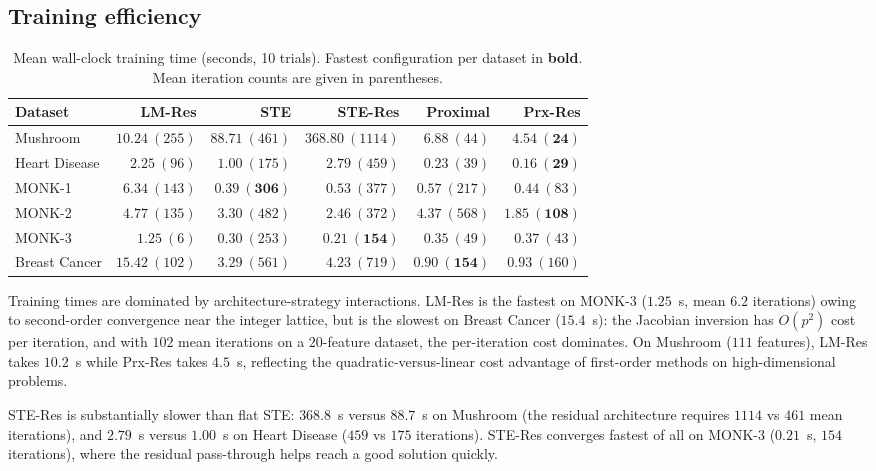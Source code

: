 \documentclass[lettersize,journal]{IEEEtran}
\begin{document}
\subsection{Training efficiency}
\label{ssec:time}

\begin{table}[t]
\centering
\caption{Mean wall-clock training time (seconds, 10 trials).
Fastest configuration per dataset in \textbf{bold}.
Mean iteration counts are given in parentheses.}
\label{tab:time}
\setlength{\tabcolsep}{6pt}
\begin{tabular}{l rrrrr}
\toprule
Dataset & LM-Res & STE & STE-Res & Proximal & Prx-Res \\
\midrule
Mushroom
  & $10.24\ (255)$ & $88.71\ (461)$ & $368.80\ (1114)$
  & $6.88\ (44)$   & $\mathbf{4.54\ (24)}$ \\
Heart Disease
  & $2.25\ (96)$  & $1.00\ (175)$  & $2.79\ (459)$
  & $0.23\ (39)$  & $\mathbf{0.16\ (29)}$ \\
MONK-1
  & $6.34\ (143)$ & $\mathbf{0.39\ (306)}$ & $0.53\ (377)$
  & $0.57\ (217)$ & $0.44\ (83)$ \\
MONK-2
  & $4.77\ (135)$ & $3.30\ (482)$ & $2.46\ (372)$
  & $4.37\ (568)$ & $\mathbf{1.85\ (108)}$ \\
MONK-3
  & $1.25\ (6)$   & $0.30\ (253)$ & $\mathbf{0.21\ (154)}$
  & $0.35\ (49)$  & $0.37\ (43)$ \\
Breast Cancer
  & $15.42\ (102)$ & $3.29\ (561)$ & $4.23\ (719)$
  & $\mathbf{0.90\ (154)}$ & $0.93\ (160)$ \\
\bottomrule
\end{tabular}
\end{table}

Training times are dominated by architecture-strategy interactions.
LM-Res is the fastest on MONK-3 ($1.25$~s, mean $6.2$ iterations) owing to
second-order convergence near the integer lattice, but is the slowest on Breast
Cancer ($15.4$~s): the Jacobian inversion has $O(p^2)$ cost per iteration,
and with $102$ mean iterations on a $20$-feature dataset, the per-iteration
cost dominates.
On Mushroom ($111$ features), LM-Res takes $10.2$~s while Prx-Res takes
$4.5$~s, reflecting the quadratic-versus-linear cost advantage of first-order
methods on high-dimensional problems.

STE-Res is substantially slower than flat STE: $368.8$~s versus $88.7$~s on
Mushroom (the residual architecture requires $1114$ vs $461$ mean iterations),
and $2.79$~s versus $1.00$~s on Heart Disease ($459$ vs $175$ iterations).
STE-Res converges fastest of all on MONK-3 ($0.21$~s, $154$ iterations),
where the residual pass-through helps reach a good solution quickly.
\end{document}

